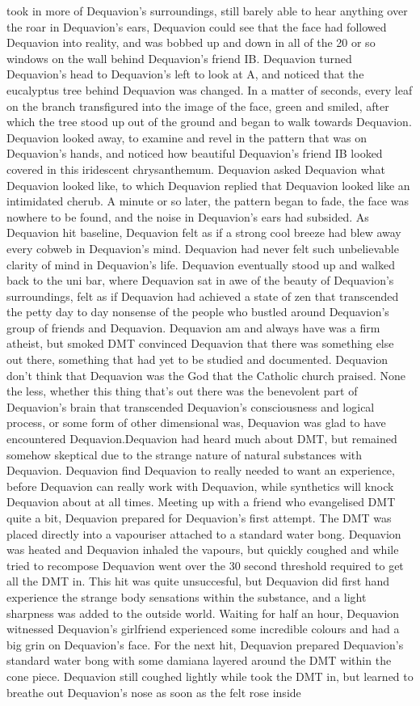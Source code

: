 \documentclass[12pt]{book}
\begin{document}
took in more of Dequavion's surroundings, still barely able to hear anything over the roar in Dequavion's ears, Dequavion could see that the face had followed Dequavion into reality, and was bobbed up and down in all of the 20 or so windows on the wall behind Dequavion's friend IB. Dequavion turned Dequavion's head to Dequavion's left to look at A, and noticed that the eucalyptus tree behind Dequavion was changed. In a matter of seconds, every leaf on the branch transfigured into the image of the face, green and smiled, after which the tree stood up out of the ground and began to walk towards Dequavion. Dequavion looked away, to examine and revel in the pattern that was on Dequavion's hands, and noticed how beautiful Dequavion's friend IB looked covered in this iridescent chrysanthemum. Dequavion asked Dequavion what Dequavion looked like, to which Dequavion replied that Dequavion looked like an intimidated cherub. A minute or so later, the pattern began to fade, the face was nowhere to be found, and the noise in Dequavion's ears had subsided. As Dequavion hit baseline, Dequavion felt as if a strong cool breeze had blew away every cobweb in Dequavion's mind. Dequavion had never felt such unbelievable clarity of mind in Dequavion's life. Dequavion eventually stood up and walked back to the uni bar, where Dequavion sat in awe of the beauty of Dequavion's surroundings, felt as if Dequavion had achieved a state of zen that transcended the petty day to day nonsense of the people who bustled around Dequavion's group of friends and Dequavion. Dequavion am and always have was a firm atheist, but smoked DMT convinced Dequavion that there was something else out there, something that had yet to be studied and documented. Dequavion don't think that Dequavion was the God that the Catholic church praised. None the less, whether this thing that's out there was the benevolent part of Dequavion's brain that transcended Dequavion's consciousness and logical process, or some form of other dimensional was, Dequavion was glad to have encountered Dequavion.Dequavion had heard much about DMT, but remained somehow skeptical due to the strange nature of natural substances with Dequavion. Dequavion find Dequavion to really needed to want an experience, before Dequavion can really work with Dequavion, while synthetics will knock Dequavion about at all times. Meeting up with a friend who evangelised DMT quite a bit, Dequavion prepared for Dequavion's first attempt. The DMT was placed directly into a vapouriser attached to a standard water bong. Dequavion was heated and Dequavion inhaled the vapours, but quickly coughed and while tried to recompose Dequavion went over the 30 second threshold required to get all the DMT in. This hit was quite unsuccesful, but Dequavion did first hand experience the strange body sensations within the substance, and a light sharpness was added to the outside world. Waiting for half an hour, Dequavion witnessed Dequavion's girlfriend experienced some incredible colours and had a big grin on Dequavion's face. For the next hit, Dequavion prepared Dequavion's standard water bong with some damiana layered around the DMT within the cone piece. Dequavion still coughed lightly while took the DMT in, but learned to breathe out Dequavion's nose as soon as the felt rose inside 
\end{document}
